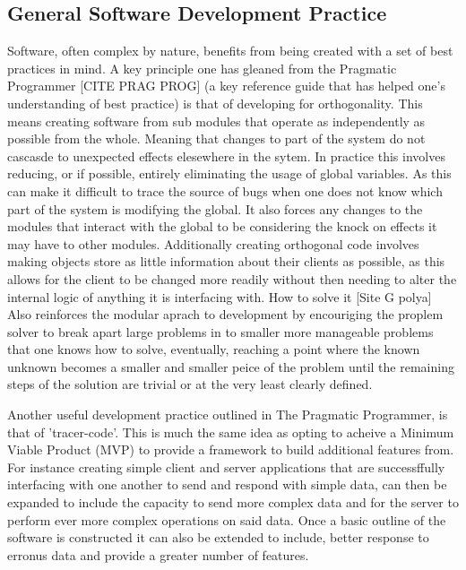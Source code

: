   \subsection{General Software Development Practice}
    Software, often complex by nature, benefits from being created with a set of best practices in mind. A key principle one has gleaned from the Pragmatic Programmer [CITE PRAG PROG] (a key reference guide that has helped one's understanding of best practice) is that of developing for orthogonality. This means creating software from sub modules that operate as independently as possible from the whole. Meaning that changes to part of the system do not cascasde to unexpected effects elesewhere in the sytem. In practice this involves reducing, or if possible, entirely eliminating the usage of global variables. As this can make it difficult to trace the source of bugs when one does not know which part of the system is modifying the global. It also forces any changes to the modules that interact with the global to be considering the knock on effects it may have to other modules. Additionally creating orthogonal code involves making objects store as little information about their clients as possible, as this allows for the client to be changed more readily without then needing to alter the internal logic of anything it is interfacing with. How to solve it [Site G polya] Also reinforces the modular aprach to development by encouriging the proplem solver to break apart large problems in to smaller more manageable problems that one knows how to solve, eventually, reaching a point where the known unknown becomes a smaller and smaller peice of the problem until the remaining steps of the solution are trivial or at the very least clearly defined.
    \par
    Another useful development practice outlined in The Pragmatic Programmer, is that of 'tracer-code'. This is much the same idea as opting to acheive a Minimum Viable Product (MVP) to provide a framework to build additional features from. For instance creating simple client and server applications that are successffully interfacing with one another to send and respond with simple data, can then be expanded to include the capacity to send more complex data and for the server to perform ever more complex operations on said data. Once a basic outline of the software is constructed it can also be extended to include, better response to erronus data and provide a greater number of features.
    \par
